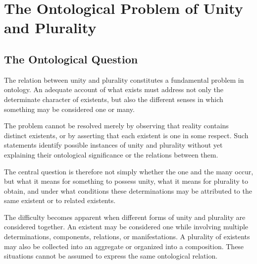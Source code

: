 %
%
%
%
%

\section{The Ontological Problem of Unity and Plurality}
\label{sec:ontological-problem-of-unity-and-plurality}

\subsection{The Ontological Question}

The relation between unity and plurality constitutes a
fundamental problem in ontology. An adequate account
of what exists must address not only the determinate
character of existents, but also the different senses
in which something may be considered one or many.

The problem cannot be resolved merely by observing
that reality contains distinct existents, or by asserting
that each existent is one in some respect. Such statements
identify possible instances of unity and plurality
without yet explaining their ontological significance
or the relations between them.

The central question is therefore not simply whether
the one and the many occur, but what it means for
something to possess unity, what it means for plurality
to obtain, and under what conditions these determinations
may be attributed to the same existent or to related
existents.

The difficulty becomes apparent when different forms
of unity and plurality are considered together. An
existent may be considered one while involving multiple
determinations, components, relations, or manifestations.
A plurality of existents may also be collected into
an aggregate or organized into a composition. These
situations cannot be assumed to express the same
ontological relation.

